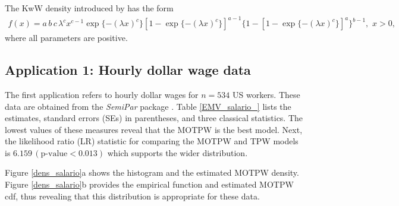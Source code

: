 \documentclass[12pt]{article}
\begin{document}
The KwW density introduced by \cite{Cord2011} has the form
\begin{eqnarray*}
f(x)= a\,b\,c\,\lambda^cx^{c-1}\exp\{-(\lambda x)^c\} [1 -\exp
\{-(\lambda x)^c\}]^{a-1}\{1-[1-\exp\{-(\lambda x)^c\}]^{a}\}^{b-1},\,\, x>0,
\end{eqnarray*}
where all parameters are positive.



\subsection{Application 1: Hourly dollar wage data}\label{applications1}

The first application refers to hourly dollar wages for $n=534$ US workers.
These data are obtained from the {\it SemiPar} package \citep{wand2005semipar}.
Table \ref{EMV_salario_} lists the estimates, standard errors (SEs) in
parentheses, and three classical statistics. The lowest values
of these measures reveal that the MOTPW is the best model. Next, the likelihood ratio (LR) statistic for
comparing the MOTPW and TPW models is $6.159\,(\mbox{p-value} < 0.013)$ which supports the wider distribution.

Figure \ref{dens_salario}a shows the histogram and the estimated MOTPW density. Figure \ref{dens_salario}b
provides the empirical function and estimated MOTPW cdf, thus revealing that this distribution is appropriate
for these data.
\end{document}

